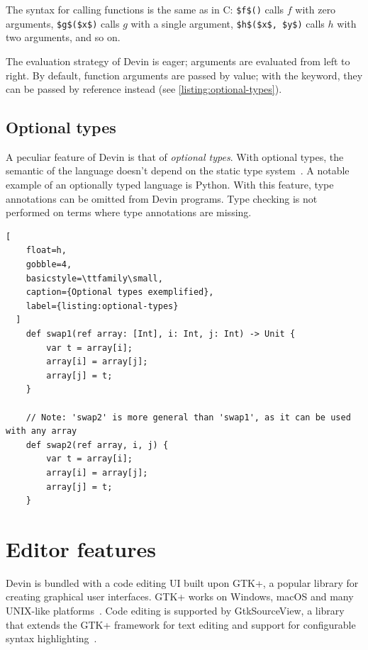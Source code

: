 \documentclass[UdineBachThesis,american,11pt]{PhdThesis}
\begin{document}
  The syntax for calling functions is the same as in C:
  \lstinline[mathescape]@$f$()@ calls $f$ with zero arguments,
  \lstinline[mathescape]@$g$($x$)@ calls $g$ with a single argument,
  \lstinline[mathescape]@$h$($x$, $y$)@ calls $h$ with two arguments, and so on.

  The evaluation strategy of Devin is eager; arguments are evaluated from left
  to right. By default, function arguments are passed by value; with the
  \lstinline@ref@ keyword, they can be passed by reference instead (see
  \autoref{listing:optional-types}).

  \subsection{Optional types}

  A peculiar feature of Devin is that of \emph{optional types}. With optional
  types, the semantic of the language doesn't depend on the static type
  system~\cite{pluggable-type-systems}. A notable example of an optionally typed
  language is Python. With this feature, type annotations can be omitted from
  Devin programs. Type checking is not performed on terms where type annotations
  are missing.

  \begin{lstlisting}[
    float=h,
    gobble=4,
    basicstyle=\ttfamily\small,
    caption={Optional types exemplified},
    label={listing:optional-types}
  ]
    def swap1(ref array: [Int], i: Int, j: Int) -> Unit {
        var t = array[i];
        array[i] = array[j];
        array[j] = t;
    }

    // Note: 'swap2' is more general than 'swap1', as it can be used with any array
    def swap2(ref array, i, j) {
        var t = array[i];
        array[i] = array[j];
        array[j] = t;
    }
  \end{lstlisting}

  \section{Editor features}
  \label{section:editor-features}

  Devin is bundled with a code editing UI built upon GTK+, a popular library for
  creating graphical user interfaces. GTK+ works on Windows, macOS and many
  UNIX-like platforms~\cite{gtk+}. Code editing is supported by GtkSourceView, a
  library that extends the GTK+ framework for text editing and support for
  configurable syntax highlighting~\cite{gtksourceview}.
\end{document}

